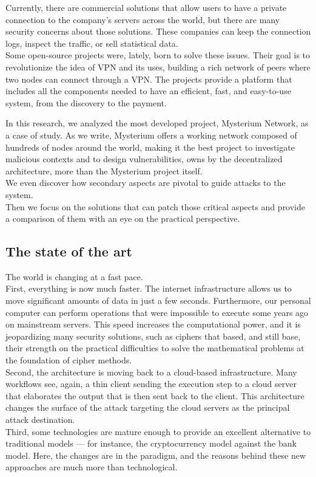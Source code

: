 \documentclass[12pt]{article}
\begin{document}
	Currently, there are commercial solutions that allow users to have a private connection to the company's servers across the world, but there are many security concerns about those solutions. These companies can keep the connection logs, inspect the traffic, or sell statistical data.\\
    Some open-source projects were, lately, born to solve these issues. Their goal is to revolutionize the idea of VPN and its uses, building a rich network of peers where two nodes can connect through a VPN. The projects provide a platform that includes all the components needed to have an efficient, fast, and easy-to-use system, from the discovery to the payment.\\
	\bigbreak
    
    In this research, we analyzed the most developed project, Mysterium Network, as a case of study. As we write, Mysterium offers a working network composed of hundreds of nodes around the world, making it the best project to investigate malicious contexts and to design vulnerabilities, owns by the decentralized architecture, more than the Mysterium project itself.\\
	We even discover how secondary aspects are pivotal to guide attacks to the system.\\
    Then we focus on the solutions that can patch those critical aspects and provide a comparison of them with an eye on the practical perspective.
	
	\subsection{The state of the art}
	The world is changing at a fast pace.\\
	First, everything is now much faster. The internet infrastructure allows us to move significant amounts of data in just a few seconds. Furthermore, our personal computer can perform operations that were impossible to execute some years ago on mainstream servers. This speed increases the computational power, and it is jeopardizing many security solutions, such as ciphers that based, and still base, their strength on the practical difficulties to solve the mathematical problems at the foundation of cipher methods.\\
	Second, the architecture is moving back to a cloud-based infrastructure. Many workflows see, again, a thin client sending the execution step to a cloud server that elaborates the output that is then sent back to the client. This architecture changes the surface of the attack targeting the cloud servers as the principal attack destination.\\
	Third, some technologies are mature enough to provide an excellent alternative to traditional models — for instance, the cryptocurrency model against the bank model. Here, the changes are in the paradigm, and the reasons behind these new approaches are much more than technological.\\
\end{document}
